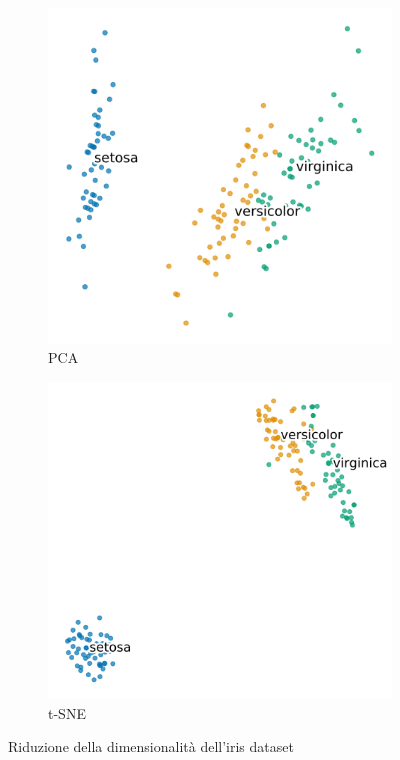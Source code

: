 \documentclass[12pt, twoside, letterpaper]{report}
\begin{document}
			\begin{figure}
				\begin{subfigure}[]{.5\textwidth}
					\centering
					\includegraphics[width=.9\linewidth]{iris_pca.png}
					\caption{PCA}
					\label{fig:iris_pca}
				\end{subfigure}
				\hfill
				\begin{subfigure}[]{.5\textwidth}
					\centering
					\includegraphics[width=.9\linewidth]{iris_tsne.png}
					\caption{t-SNE}
					\label{fig:iris_tsne}
				\end{subfigure}
				
				\caption{Riduzione della dimensionalità dell'iris dataset}
				\label{fig:pca_tsne_iris}
			\end{figure}	
\end{document}

